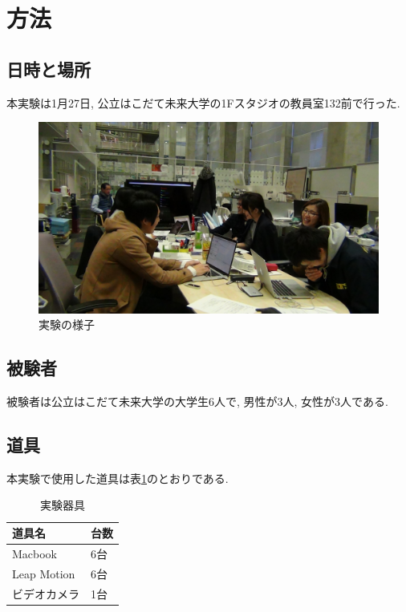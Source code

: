 \documentclass{funthesis}
\begin{document}
\section{方法}
\subsection{日時と場所}

本実験は1月27日, 公立はこだて未来大学の1Fスタジオの教員室132前で行った. 
 \begin{figure}[H]
 \begin{center}
  \includegraphics[width=120mm]{./img/DSC00031.JPG}
 \end{center}
 \caption{実験の様子}
 \label{zi}
\end{figure}

\subsection{被験者}
被験者は公立はこだて未来大学の大学生6人で, 男性が3人, 女性が3人である. 

\subsection{道具}
本実験で使用した道具は表\ref{tools}のとおりである. 

\begin{table}[H]
\begin{center}
\caption{実験器具}
  \begin{tabular}{ll}
   \hline
   道具名 & 台数\\
   \hline
   Macbook & 6台\\
   \hline
   Leap Motion & 6台\\ 
   \hline
  ビデオカメラ & 1台\\ 
   \hline
   \end{tabular}
   \label{tools}
  \end{center}
\end{table}
\end{document}
